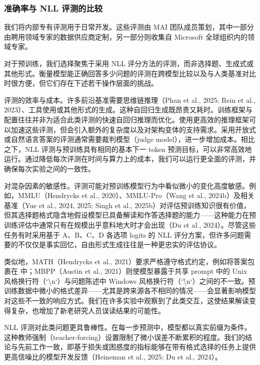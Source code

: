 \documentclass[
  10
]{article}
\begin{document}
\subsubsection{准确率与 NLL 评测的比较}\label{comparison-of-accuracy-and-nll-evaluations}

我们将内部专有评测用于日常开发。这些评测由 MAI 团队成员策划，其中一部分由聘用领域专家的数据供应商定制，另一部分则收集自 Microsoft 全球组织内的领域专家。

对于预训练，我们选择聚焦于采用 NLL 评分方法的评测，而非选择题、生成式或其他形式。衡量模型能正确回答多少问题的评测在跨模型比较以及与人类基准对比时很方便，但它们存在下述若干操作层面的挑战。

评测的效率与成本。许多前沿基准需要思维链推理（Phan et al., 2025; Rein et al., 2023）、工具使用或其他形式的生成。这种自回归生成既昂贵又耗时。训练框架与配置往往并非为适合此类评测的快速自回归推理而优化。使用更高效的推理框架可以加速这些评测，但会引入额外的复杂度以及对架构变体的支持需求。采用开放式或自然语言答案的评测通常需要裁判模型（judge model），进一步增加成本。相比之下，NLL 评测与预训练具有相同的基本下一 token 预测目标，可以非常高效地运行。通过降低每次评测在时间与算力上的成本，我们可以运行更全面的评测，并确保每次实验之间的一致性。

对混杂因素的敏感性。评测可能对预训练模型行为中看似微小的变化高度敏感。例如，MMLU（Hendrycks et al., 2020）、MMLU-Pro（Wang et al., 2024b）及相关基准（Yue et al., 2024, 2025; Singh et al., 2025b）对评估预训练知识很有价值，但其选择题格式隐含地假设模型已具备解读和作答选择题的能力——这种能力在预训练评估中通常只有在规模出乎意料地大时才会出现（Du et al., 2024）。尽管这些任务有时采用基于 A、B、C、D 各选项 logits 的 NLL 评分方案，但许多问题需要的不仅仅是事实回忆，自由形式生成往往是一种更忠实的评估协议。

类似地，MATH（Hendrycks et al., 2021）要求严格遵守格式约定，例如将答案包裹在 \boxed{} 中；MBPP（Austin et al., 2021）则使模型暴露于共享 prompt 中的 Unix 风格换行符（`\textbackslash{}n`）与问题陈述中 Windows 风格换行符（`\r\textbackslash{}n`）之间的不一致。预训练数据中微小的格式差异——尤其是跨来源各不相同的情况——会显著影响模型对这些不一致的响应方式。我们在许多实验中观察到了此类交互，这使结果解读变得复杂，也增加了新老研究人员误读结果的可能性。

NLL 评测对此类问题更具鲁棒性。在每一步预测中，模型都以真实前缀为条件。这种教师强制（teacher-forcing）设置限制了微小误差不断累积的程度。我们的结论与先前工作一致，即基于损失或困惑度的指标能够在带有格式选择的任务上提供更高信噪比的模型开发反馈（Heineman et al., 2025; Du et al., 2024）。
\end{document}
